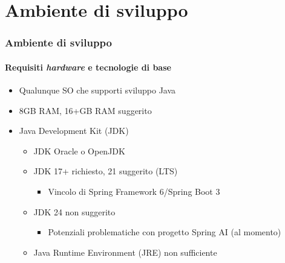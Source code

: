 \section{Ambiente di sviluppo} %
\label{sec:dev-env}
%
\begin{frame}[t,fragile] \frametitle{Ambiente di sviluppo}
\framesubtitle{Requisiti \textit{hardware} e tecnologie di base}
    \begin{itemize}[leftmargin=20pt,align=right]
        \item[\alert{\faArrowCircleRight}] Qualunque SO che supporti sviluppo Java
        \item[\alert{\faArrowCircleRight}] \alert{8GB RAM}, 16+GB RAM suggerito
        \item[\alert{\faArrowCircleRight}] Java Development Kit (JDK)     
        \begin{itemize}[leftmargin=20pt,align=right]
            \item[\alert{\faArrowCircleRight}] JDK Oracle o OpenJDK
            \item[\alert{\faArrowCircleRight}] JDK \alert{17+} richiesto, \alert{21} suggerito (LTS)
            \begin{itemize}[leftmargin=20pt,align=right]
                \item[\alert{\faArrowCircleRight}] Vincolo di Spring Framework \alert{6}/Spring Boot \alert{3}
            \end{itemize}
            \item[\alert{\faExclamationTriangle}] JDK \alert{24 non} suggerito
            \begin{itemize}[leftmargin=20pt,align=right]
                \item[\alert{\faArrowCircleRight}] Potenziali problematiche con progetto Spring AI (al momento)
            \end{itemize}
            \item[\alert{\faExclamationTriangle}] Java Runtime Environment (JRE) \alert{non} sufficiente
        \end{itemize}
    \end{itemize}
\end{frame}
%
